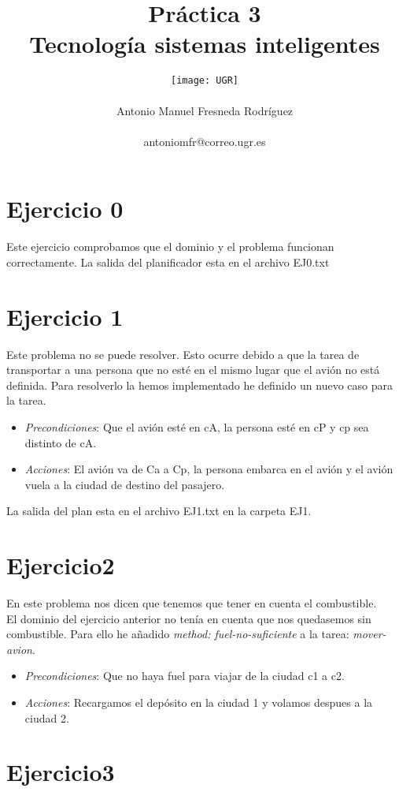 \documentclass[10pt,spanish]{article}
\author{
	\texttt{[image: UGR]} \\\\
	\Large 	Antonio Manuel Fresneda Rodríguez\\
	\\antoniomfr@correo.ugr.es
	\\
}
\date{}
\title{\huge \textbf{Práctica 3\\ Tecnología sistemas inteligentes}}
\begin{document}
	\maketitle
	\pagebreak
	\tableofcontents
	\pagebreak
	\section{Ejercicio 0}
	Este ejercicio comprobamos que el dominio y el problema funcionan correctamente. La salida del planificador esta en el archivo EJ0.txt
	\section{Ejercicio 1}
	Este problema no se puede resolver. Esto ocurre debido a que la tarea de transportar a una persona que no esté en el mismo lugar que el avión no está definida.
	Para resolverlo la hemos implementado he definido un nuevo caso para la tarea.
	\begin{itemize}
		\item \textit {Precondiciones}: Que el avión esté en cA, la persona esté en cP y cp sea distinto de cA.
		\item \textit {Acciones}: El avión va de Ca a Cp, la persona embarca en el avión y el avión vuela a la ciudad de destino del pasajero.
	\end{itemize}
	La salida del plan esta en el archivo EJ1.txt en la carpeta EJ1.
	\section{Ejercicio2}
	En este problema nos dicen que tenemos que tener en cuenta el combustible.\\
	El dominio del ejercicio anterior no tenía en cuenta que nos quedasemos sin combustible. Para ello he añadido \textit{method: fuel-no-suficiente} a la tarea: \textit{mover-avion}.\\
		\begin{itemize}
			\item \textit{Precondiciones}: Que no haya fuel para viajar de la ciudad c1 a c2.
			\item \textit{Acciones}: Recargamos el depósito en la ciudad 1 y volamos despues a la ciudad 2.
		\end{itemize}
	\section{Ejercicio3}
	
\end{document}
